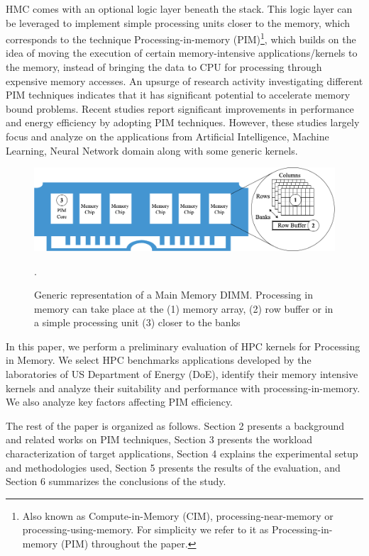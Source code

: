 HMC comes with an optional logic layer beneath the stack. This logic layer can be leveraged to implement simple processing units closer to the memory, which corresponds to the technique Processing-in-memory (PIM)\footnote{Also known as Compute-in-Memory (CIM), processing-near-memory or processing-using-memory. For simplicity we refer to it as Processing-in-memory (PIM) throughout the paper.}, which builds on the idea of moving the execution of certain memory-intensive applications/kernels to the memory, instead of bringing the data to CPU for processing through expensive memory accesses. An upsurge of research activity investigating different PIM techniques indicates that it has significant potential to accelerate memory bound problems. Recent studies report significant improvements in performance and energy efficiency by adopting PIM techniques. However, these studies largely focus and analyze on the applications from Artificial Intelligence, Machine Learning, Neural Network domain along with some generic kernels. 

\begin{figure}[t!]
\centering
\includegraphics[width=.8\linewidth]{MEMSYS22/figures/pimcat.png}
\caption{Generic representation of a Main Memory DIMM. Processing in memory can take place at the (1) memory array, (2) row buffer or in a simple processing unit (3) closer to the banks}.
\label{fig:pimcat}
\end{figure}   

In this paper, we perform a preliminary evaluation of HPC kernels for Processing in Memory. We select HPC benchmarks applications developed by the laboratories of US Department of Energy (DoE), identify their memory intensive kernels and analyze their suitability and performance with processing-in-memory. We also analyze key factors affecting PIM efficiency.  

The rest of the paper is organized as follows. Section 2 presents a background and related works on PIM techniques, Section 3 presents the workload characterization of target applications, Section 4 explains the experimental setup and methodologies used, Section 5 presents the results of the evaluation, and Section 6 summarizes the conclusions of the study.   


